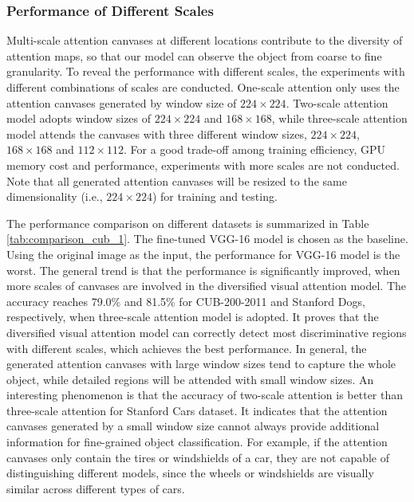 \documentclass[journal]{IEEEtran}
\begin{document}
\subsubsection{Performance of Different Scales}
Multi-scale attention canvases at different locations contribute to the diversity of attention maps, so that our model can observe the object from coarse to fine granularity. To reveal the performance with different scales, the experiments with different combinations of scales are conducted. One-scale attention only uses the attention canvases generated by window size of $224 \times 224$. Two-scale attention model adopts window sizes of $224 \times 224$ and $168 \times 168$, while three-scale attention model attends the canvases with three different window sizes, $224 \times 224$, $168\times 168$ and $112\times 112$. For a good trade-off among training efficiency, GPU memory cost and performance, experiments with more scales are not conducted. Note that all generated attention canvases will be resized to the same dimensionality (i.e., $224\times 224$) for training and testing. 

The performance comparison on different datasets is summarized in Table \ref{tab:comparison_cub_1}. The fine-tuned VGG-16 model is chosen as the baseline. Using the original image as the input, the performance for VGG-16 model is the worst. The general trend is that the performance is significantly improved, when more scales of canvases are involved in the diversified visual attention model. The accuracy reaches 79.0\% and 81.5\% for CUB-200-2011 and Stanford Dogs, respectively, when three-scale attention model is adopted. It proves that the diversified visual attention model can correctly detect most discriminative regions  with different scales, which achieves the best performance. In general, the generated attention canvases with large window sizes tend to capture the whole object, while detailed regions will be attended with small window sizes. An interesting phenomenon is that the accuracy of two-scale attention is better than three-scale attention for Stanford Cars dataset. It indicates that the attention canvases generated by a small window size cannot always provide additional information for fine-grained object classification. For example, if the attention canvases only contain the tires or windshields of a car, they are not capable of distinguishing different models, since the wheels or windshields are visually similar across different types of cars.
\end{document}
